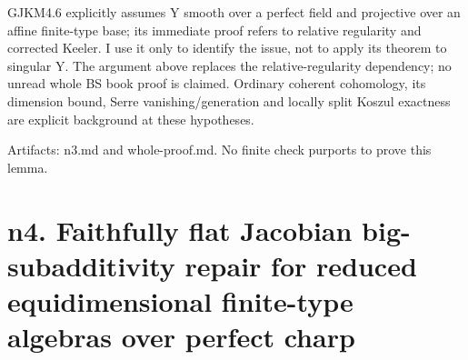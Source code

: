\documentclass[11pt]{article}
\begin{document}
\begin{OwnProofBody}
GJKM4.6 explicitly assumes Y smooth over a perfect field and projective over an affine finite-type base; its immediate proof refers to relative regularity and corrected Keeler. I use it only to identify the issue, not to apply its theorem to singular Y. The argument above replaces the relative-regularity dependency; no unread whole BS book proof is claimed. Ordinary coherent cohomology, its dimension bound, Serre vanishing/generation and locally split Koszul exactness are explicit background at these hypotheses.

Artifacts: n3.md and whole-proof.md. No finite check purports to prove this lemma.

\end{OwnProofBody}

\section{n4. Faithfully flat Jacobian big-subadditivity repair for reduced equidimensional finite-type algebras over perfect charp}
\end{document}
